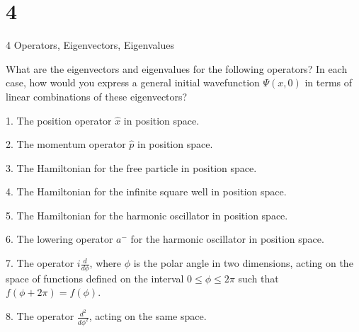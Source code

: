 \documentclass{article}
\begin{document}
\newpage

\section*{4}
\begin{ques}\label{q4}
4 Operators, Eigenvectors, Eigenvalues

What are the eigenvectors and eigenvalues for the following operators? In each case, how would you express a general initial wavefunction $\Psi(x,0)$ in terms of linear combinations of these eigenvectors?

1. The position operator $\hat{x}$ in position space.

2. The momentum operator $\hat{p}$ in position space.

3. The Hamiltonian for the free particle in position space.

4. The Hamiltonian for the infinite square well in position space.

5. The Hamiltonian for the harmonic oscillator in position space.

6. The lowering operator $a^-$ for the harmonic oscillator in position space.

7. The operator $i\frac{d}{d\phi}$, where $\phi$ is the polar angle in two dimensions, acting on the space of functions defined on the interval $0\le\phi\le 2\pi$ such that $f(\phi+2\pi)=f(\phi)$.

8. The operator $\frac{d^2}{d\phi^2}$, acting on the same space.
\end{ques}
\end{document}
